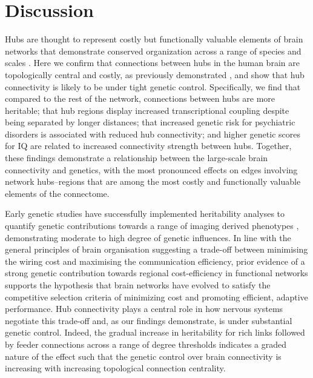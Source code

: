 \section{Discussion}

Hubs are thought to represent costly but functionally valuable elements of brain networks \citep{VandenHeuvel2012} that demonstrate conserved organization across a range of species and scales \citep{Harriger2012,Towlson2013,VandenHeuvel2011,Zamora-Lopez2010}. Here we confirm that connections between hubs in the human brain are topologically central and costly, as previously demonstrated \citep{VandenHeuvel2012}, and show that hub connectivity is likely to be under tight genetic control. Specifically, we find that compared to the rest of the network, connections between hubs are more heritable; that hub regions display increased transcriptional coupling despite being separated by longer distances; that increased genetic risk for psychiatric disorders is associated with reduced hub connectivity; and higher genetic scores for IQ are related to increased connectivity strength between hubs. Together, these findings demonstrate a relationship between the large-scale brain connectivity and genetics, with the most pronounced effects on edges involving network hubs--regions that are among the most costly and functionally valuable elements of the connectome.

Early genetic studies have successfully implemented heritability analyses to quantify genetic contributions towards a range of imaging derived phenotypes \citep{Colclough2017,Fornito2011,Peper2007,Roshchupkin2016,Shen2014,Sinclair2015,Sudre2017,Thompson2001}, demonstrating moderate to high degree of genetic influences. In line with the general principles of brain organisation suggesting a trade-off between minimising the wiring cost and maximising the communication efficiency, prior evidence of a strong genetic contribution towards regional cost-efficiency in functional networks \citep{Fornito2011} supports the hypothesis that brain networks have evolved to satisfy the competitive selection criteria of minimizing cost and promoting efficient, adaptive performance. Hub connectivity plays a central role in how nervous systems negotiate this trade-off \citep{VandenHeuvel2013b}  and, as our findings demonstrate, is under substantial genetic control. Indeed, the gradual increase in heritability for rich links followed by feeder connections across a range of degree thresholds indicates a graded nature of the effect such that the genetic control over brain connectivity is increasing with increasing topological connection centrality.

